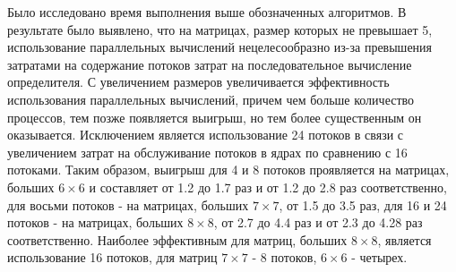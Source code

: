 \documentclass[a4paper,oneside,14pt]{extreport}
\begin{document}
Было исследовано время выполнения выше обозначенных алгоритмов. В результате было выявлено, что на матрицах, размер которых не превышает 5, использование параллельных вычислений нецелесообразно из-за превышения затратами на содержание потоков затрат на последовательное вычисление определителя. С увеличением размеров увеличивается эффективность использования параллельных вычислений, причем чем больше количество процессов, тем позже появляется выигрыш, но тем более существенным он оказывается. Исключением является использование 24 потоков в связи с увеличением затрат на обслуживание потоков в ядрах по сравнению с 16 потоками. Таким образом, выигрыш для 4 и 8 потоков проявляется на матрицах, больших $6\times6$ и составляет от 1.2 до 1.7 раз и от 1.2 до 2.8 раз соответственно, для восьми потоков - на матрицах, больших $7\times7$, от 1.5 до 3.5 раз, для 16 и 24 потоков - на матрицах, больших $8\times8$, от  2.7 до 4.4 раз и от 2.3 до 4.28 раз соответственно. Наиболее эффективным для матриц, больших $8\times8$, является использование 16 потоков, для матриц $7\times7$ - 8 потоков, $6\times6$ - четырех.

\newpage
{}



\nocite{*}
\end{document}
